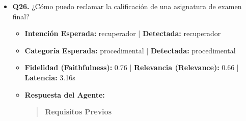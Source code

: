 \documentclass[12pt,a4paper,oneside]{report}
\begin{document}
\begin{itemize}
\begin{itemize}
\begin{quote}
En resumen, para justificar el gasto de alojamiento en un viaje oficial, se deben aportar facturas que cumplan con los requisitos establecidos y que estén acompañadas del correspondiente justificante del pago efectuado.
                \end{quote}
          \item \textbf{{Ground Truth (Referencia):}} \\
                \begin{quote}
Debe aportarse la factura original expedida a nombre de la Universidad de Sevilla o del propio comisionado, detallando los días de estancia, el coste de la habitación y desglosando el IVA.
                \end{quote}
          \item \textbf{{Referencias / Fuentes Utilizadas:}} \\
                \begin{itemize}
                  \item Miniguía viajes personal propio US.pdf (Página 6)
                  \item guia-completa-liquidacion-de-viajes-v2.pdf (Página 19)
                  \item Miniguía viajes personal propio US.pdf (Página 4)
                  \item guia-breve-liquidacion.pdf (Página 1)
                \end{itemize}
        \end{itemize}

  
\item \textbf{Q26.} ¿Cómo puedo reclamar la calificación de una asignatura de examen final? \\
        \begin{itemize}
          \item \textbf{Intención Esperada:} recuperador | \textbf{Detectada:} recuperador
          \item \textbf{Categoría Esperada:} procedimental | \textbf{Detectada:} procedimental
          \item \textbf{Fidelidad (Faithfulness):} 0.76 | \textbf{Relevancia (Relevance):} 0.66 | \textbf{Latencia:} 3.16s
          \item \textbf{{Respuesta del Agente:}} \\
                \begin{quote}

\noindent\textbf{Requisitos Previos}\\


\end{quote}
\end{itemize}
\end{itemize}
\end{document}
